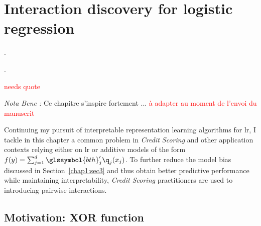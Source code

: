 \chapter{Interaction discovery for logistic regression} \label{chap5}


\epigraph{.}{.}

\minitoc


\textcolor{red}{needs quote}

\textit{Nota Bene :} Ce chapitre s'inspire fortement ... \textcolor{red}{à adapter au moment de l'envoi du manuscrit}

\bigskip

Continuing my pursuit of interpretable representation learning algorithms for \gls{lr}, I tackle in this chapter a common problem in \textit{Credit Scoring} and other application contexts relying either on \gls{lr} or additive models of the form $f(y) = \sum_{j=1}^d \glssymbol{bth}_j' \q_j(x_j)$. To further reduce the model bias discussed in Section~\ref{chap1:sec3} and thus obtain better predictive performance while maintaining interpretability, \textit{Credit Scoring} practitioners are used to introducing pairwise interactions.


\section{Motivation: XOR function}

